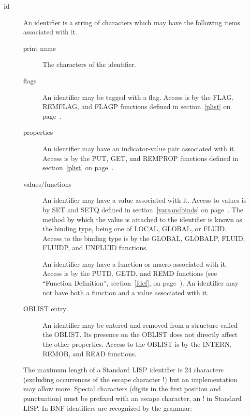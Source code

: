 \documentclass[11pt,letterpaper]{book}
\begin{document}
\begin{description}
\item[id] An identifier is a string of characters which may have the
 
following items associated with it.

\begin{description}
\item[print name]  The characters of the identifier.

\item[flags] An identifier may be tagged with a flag. Access is by the
FLAG, REMFLAG, and FLAGP functions defined in section~\ref{plist} on
page~\pageref{plist}.   

\item[properties]  An identifier may have an
indicator-value pair associated with it. Access is by the PUT, GET,
and REMPROP functions defined in section~\ref{plist} on
page~\pageref{plist}.
  

\item[values/functions] An identifier may have a value associated with
  it. Access to values is by SET and SETQ
defined in   section~\ref{varsandbinds} on
page~\pageref{varsandbinds}. The method by which the value is attached
to the identifier is known as the binding type, being one of LOCAL,
GLOBAL, or FLUID. Access to the binding type is by the GLOBAL,
GLOBALP, FLUID, FLUIDP, and UNFLUID functions.
    

An identifier may have a function or macro associated with it. Access
is by the PUTD, GETD, and REMD functions (see ``Function Definition'',
section~\ref{fdef}, on page~\pageref{fdef}).  
 An identifier may not have both a function and a value
associated with it.

\item[OBLIST entry]  An identifier may be entered and
removed from a structure called the OBLIST. Its presence on the OBLIST
does not directly affect the other properties. Access to the OBLIST is
by the INTERN, REMOB, and READ functions.  
\end{description}

The maximum length of a Standard LISP identifier is 24 characters
(excluding occurrences of the escape character !) but an
implementation may allow more. Special characters (digits in the first
position and punctuation) must be prefixed with an escape character,
an ! in Standard LISP. In BNF identifiers are recognized by the
grammar:



\end{description}
\end{document}
